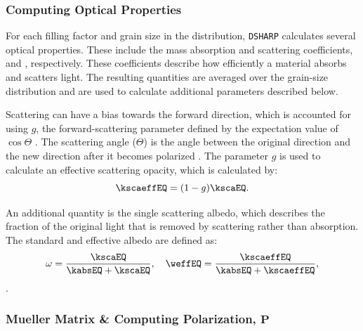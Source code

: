 






\subsubsection{Computing Optical Properties}
For each filling factor and grain size in the distribution, \texttt{DSHARP} calculates several optical properties. These include the mass absorption and scattering coefficients, \kabs and \kscaNS, respectively. These coefficients describe how efficiently a material absorbs and scatters light. The resulting quantities are averaged over the grain-size distribution and are used to calculate additional parameters described below. 


Scattering can have a bias towards the forward direction, which is accounted for using $g$, the forward-scattering parameter defined by the expectation value of $\cos\Theta$ \citep{dsharp_code}. The scattering angle ($\Theta$) is the angle between the original direction and the new direction after it becomes polarized \citep{Zhang2023}. The parameter $g$ is used to calculate an effective scattering opacity, which is calculated by:
\begin{equation}
    \kscaeffEQ = (1-g)\kscaEQ.
\end{equation}
 


An additional quantity is the single scattering albedo, which describes the fraction of the original light that is removed by scattering rather than absorption. The standard and effective albedo are defined as:
\begin{equation}
    \omega = \frac{\kscaEQ}{\kabsEQ + \kscaEQ}, \quad 
    \weffEQ = \frac{\kscaeffEQ}{\kabsEQ + \kscaeffEQ},
    \label{eq: omega}
\end{equation}
\noindent \citep{Zhang2023}. 



%








\subsubsection{Mueller Matrix \& Computing Polarization, $\mathbf{P}$ }


